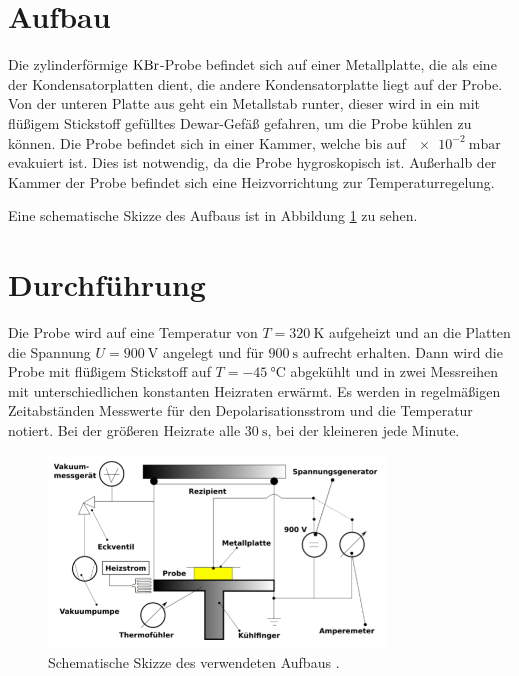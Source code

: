 \section{Aufbau}
\label{sec:Aufbau}
Die zylinderförmige $\ce{KBr}$-Probe befindet sich auf einer Metallplatte,
die als eine der Kondensatorplatten dient, die andere Kondensatorplatte
liegt auf der Probe. Von der unteren Platte aus geht ein Metallstab runter,
dieser wird in ein mit flüßigem Stickstoff gefülltes Dewar-Gefäß gefahren,
um die Probe kühlen zu können.
Die Probe befindet sich in einer Kammer, welche bis auf
$\SI{e-2}{\milli\bar}$ %
evakuiert ist. Dies ist notwendig, da die Probe hygroskopisch ist.
Außerhalb der Kammer der Probe befindet sich eine Heizvorrichtung
zur Temperaturregelung.

Eine schematische Skizze des Aufbaus ist in Abbildung \ref{fig:skizze} zu sehen.

\section{Durchführung}
\label{sec:durchfuehrung}
Die Probe wird auf eine Temperatur von $T = \SI{320}{\kelvin}$ aufgeheizt
und an die Platten die Spannung $U = \SI{900}{\volt}$ angelegt
und für $\SI{900}{\second}$ aufrecht erhalten. Dann wird die Probe mit
flüßigem Stickstoff auf $T = -\SI{45}{\celsius}$ abgekühlt und in zwei
Messreihen mit unterschiedlichen konstanten Heizraten erwärmt.
Es werden in regelmäßigen Zeitabständen Messwerte für den
Depolarisationsstrom und die Temperatur notiert.
Bei der größeren Heizrate alle $\SI{30}{\second}$, bei der kleineren jede Minute.

\begin{figure}
    \centering
    \includegraphics[width=0.8\textwidth]{pdf/aufbauSkizze.png}
    \caption{Schematische Skizze des verwendeten Aufbaus \cite{anleitung}.}
    \label{fig:skizze}
\end{figure}
